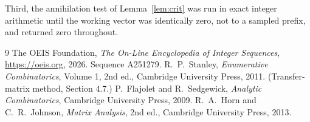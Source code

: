 \documentclass[11pt,a4paper]{article}
\theoremstyle{plain}
\theoremstyle{definition}
\begin{document}
Third, the annihilation test of Lemma~\ref{lem:crit} was run in exact integer arithmetic
until the working vector was identically zero, not to a sampled prefix, and returned zero
throughout.

\begin{thebibliography}{9}
 The OEIS Foundation, \emph{The On-Line Encyclopedia of Integer
Sequences}, \url{https://oeis.org}, 2026. Sequence A251279.
 R.~P.~Stanley, \emph{Enumerative Combinatorics}, Volume 1, 2nd ed.,
Cambridge University Press, 2011. (Transfer-matrix method, Section 4.7.)
 P.~Flajolet and R.~Sedgewick, \emph{Analytic Combinatorics}, Cambridge
University Press, 2009.
 R.~A.~Horn and C.~R.~Johnson, \emph{Matrix Analysis}, 2nd ed., Cambridge
University Press, 2013.
\end{thebibliography}
\end{document}
